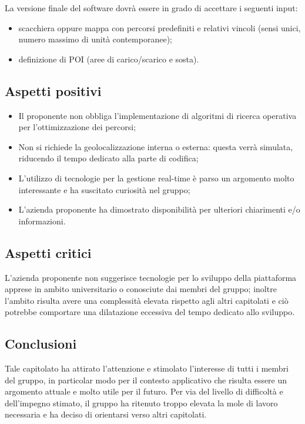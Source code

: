 La versione finale del software dovrà essere in grado di accettare i seguenti input:
\begin{itemize}
\item scacchiera oppure mappa con percorsi predefiniti e relativi vincoli (sensi unici, numero massimo di unità contemporanee);
\item definizione di POI (aree di carico/scarico e sosta).
\end{itemize}

\subsection{Aspetti positivi}
\begin{itemize}
\item Il proponente non obbliga l'implementazione di algoritmi di ricerca operativa per l'ottimizzazione dei percorsi;
\item Non si richiede la geolocalizzazione interna o esterna: questa verrà simulata, riducendo il tempo dedicato alla parte di codifica;
\item L'utilizzo di tecnologie per la gestione real-time è parso un argomento molto interessante e ha suscitato curiosità nel gruppo;
\item L'azienda proponente ha dimostrato disponibilità per ulteriori chiarimenti e/o  informazioni.
\end{itemize}

\subsection{Aspetti critici}
L'azienda proponente non suggerisce tecnologie per lo sviluppo della piattaforma apprese in ambito universitario o conosciute dai membri del gruppo; inoltre l'ambito risulta avere una complessità elevata rispetto agli altri capitolati e ciò potrebbe comportare una dilatazione eccessiva del tempo dedicato allo sviluppo.

\subsection{Conclusioni}
Tale capitolato ha attirato l'attenzione e stimolato l'interesse di tutti i membri del gruppo, in particolar modo per il contesto applicativo che risulta essere un argomento attuale e molto utile per il futuro.
Per via del livello di difficoltà e dell'impegno stimato, il gruppo ha ritenuto troppo elevata la mole di lavoro necessaria e ha deciso di orientarsi verso altri capitolati. 

